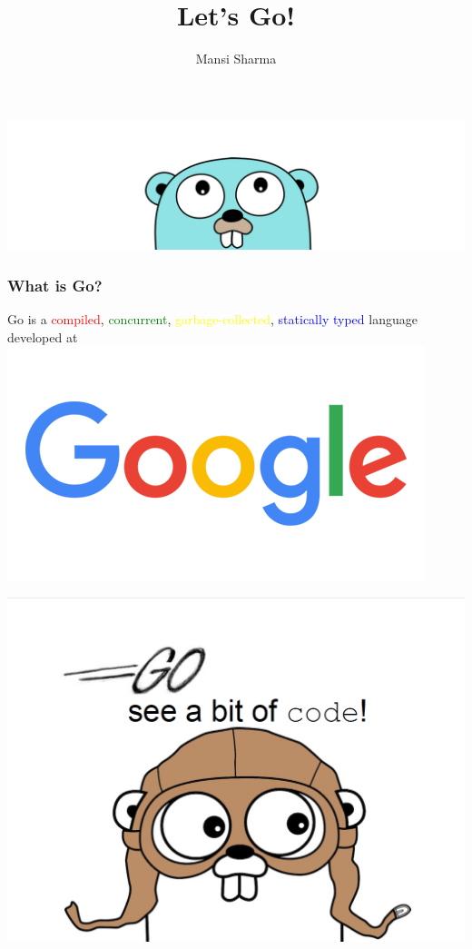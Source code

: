 \documentclass[14pt]{beamer}
\title[A Tour of Go]{\huge Let's Go!}
\author{Mansi Sharma}
\begin{document}
{
\begin{frame}
    \titlepage
    \includegraphics[width=\linewidth]{img/golang.png}
\end{frame}
}

{
\begin{frame}
    \frametitle {What is Go?}
    \begin{center}
        \textcolor{deepblue}{Go is a \textcolor{red}{compiled}, \textcolor{green}{concurrent}, \textcolor{yellow}{garbage-collected}, \textcolor{blue}{statically typed} language developed at}
        \linebreak
        \includegraphics[width=0.3\linewidth]{img/google.png}
    \end{center}
\end{frame}
}

{
\begin{frame}
    \includegraphics[width=\linewidth]{img/golang.PNG}
\end{frame}
}
\end{document}
